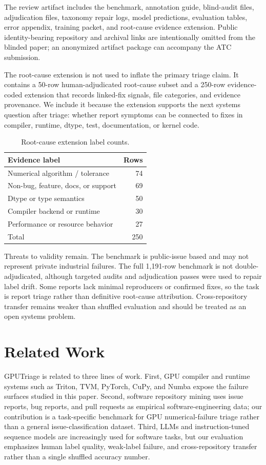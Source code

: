 \documentclass[sigplan,10pt]{acmart}
\newcommand{\system}{GPUTriage}
\begin{document}
The review artifact includes the benchmark, annotation guide, blind-audit files,
adjudication files, taxonomy repair logs, model predictions, evaluation tables,
error appendix, training packet, and root-cause evidence extension. Public
identity-bearing repository and archival links are intentionally omitted from
the blinded paper; an anonymized artifact package can accompany the ATC
submission.

The root-cause extension is not used to inflate the primary triage claim. It
contains a 50-row human-adjudicated root-cause subset and a 250-row
evidence-coded extension that records linked-fix signals, file categories, and
evidence provenance. We include it because the extension supports the next
systems question after triage: whether report symptoms can be connected to
fixes in compiler, runtime, dtype, test, documentation, or kernel code.

\begin{table}[t]
\centering
\caption{Root-cause extension label counts.}
\label{tab:rootcause}
\begin{tabular}{lr}
\toprule
Evidence label & Rows \\
\midrule
Numerical algorithm / tolerance & 74 \\
Non-bug, feature, docs, or support & 69 \\
Dtype or type semantics & 50 \\
Compiler backend or runtime & 30 \\
Performance or resource behavior & 27 \\
\midrule
Total & 250 \\
\bottomrule
\end{tabular}
\end{table}

Threats to validity remain. The benchmark is public-issue based and may not
represent private industrial failures. The full 1,191-row benchmark is not
double-adjudicated, although targeted audits and adjudication passes were used
to repair label drift. Some reports lack minimal reproducers or confirmed fixes,
so the task is report triage rather than definitive root-cause attribution.
Cross-repository transfer remains weaker than shuffled evaluation and should be
treated as an open systems problem.

\section{Related Work}

\system{} is related to three lines of work. First, GPU compiler and runtime
systems such as Triton, TVM, PyTorch, CuPy, and Numba expose the failure
surfaces studied in this paper. Second, software repository mining uses issue
reports, bug reports, and pull requests as empirical software-engineering data;
our contribution is a task-specific benchmark for GPU numerical-failure triage
rather than a general issue-classification dataset. Third, LLMs and
instruction-tuned sequence models are increasingly used for software tasks, but
our evaluation emphasizes human label quality, weak-label failure, and
cross-repository transfer rather than a single shuffled accuracy number.
\end{document}
